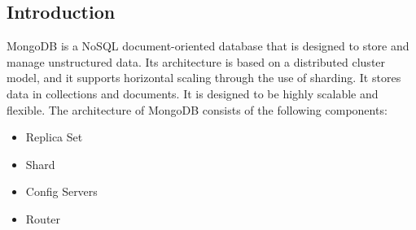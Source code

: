 \documentclass[12pt]{article}
\begin{document}
\subsection{Introduction}
MongoDB is a NoSQL document-oriented database that is designed to store and manage unstructured data. Its architecture is based on a distributed cluster
model, and it supports horizontal scaling through the use of sharding. It stores data in collections and documents. It is designed to be highly scalable and flexible. The architecture
of MongoDB consists of the following components:
\begin{itemize}
    \item Replica Set
    \item Shard
    \item Config Servers
    \item Router
\end{itemize}
  
\end{document}
